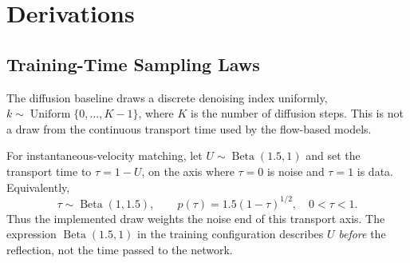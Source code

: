 \appendix{}

\chapter{Derivations}\label{app:derivations}

\section{Training-Time Sampling Laws}\label{app:training-time-laws}

The diffusion baseline draws a discrete denoising index uniformly,
$k\sim\operatorname{Uniform}\{0,\ldots,K-1\}$, where $K$ is the number of diffusion steps. This is not
a draw from the continuous transport time used by the flow-based models.

For instantaneous-velocity matching, let $U\sim\operatorname{Beta}(1.5,1)$ and set the transport
time to $\tau=1-U$, on the axis where $\tau=0$ is noise and $\tau=1$ is data. Equivalently,
\begin{equation}
  \tau\sim\operatorname{Beta}(1,1.5),\qquad
  p(\tau)=1.5(1-\tau)^{1/2},\quad 0<\tau<1.
\end{equation}
Thus the implemented draw weights the noise end of this transport axis. The expression
$\operatorname{Beta}(1.5,1)$ in the training configuration describes $U$ \emph{before} the reflection,
not the time passed to the network.

